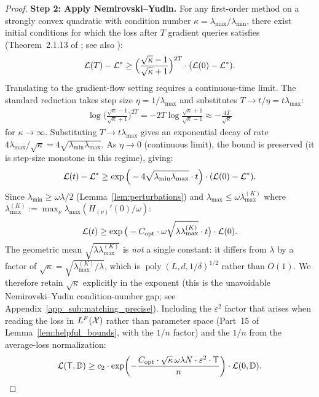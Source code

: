 \documentclass[11pt]{article}
\theoremstyle{plain}
\DeclareMathOperator{\poly}{poly}
\begin{document}
\begin{proof}
    \textbf{Step 2: Apply Nemirovski--Yudin.} For any first-order method on a strongly convex quadratic with condition number $\kappa = \lambda_{\max}/\lambda_{\min}$, there exist initial conditions for which the loss after $T$ gradient queries satisfies (Theorem~2.1.13 of \citealp{nes03}; see also \citealp{ny83}):
    \begin{align*}
        {\cal L}(T) - {\cal L}^* \ge \Big(\frac{\sqrt{\kappa}-1}{\sqrt{\kappa}+1}\Big)^{2T} \cdot ({\cal L}(0)-{\cal L}^*).
    \end{align*}
    Translating to the gradient-flow setting requires a continuous-time limit. The standard reduction takes step size $\eta = 1/\lambda_{\max}$ and substitutes $T \to t/\eta = t\lambda_{\max}$:
    \begin{align*}
        \log\Big(\frac{\sqrt\kappa - 1}{\sqrt\kappa + 1}\Big)^{2T} = -2T \log\frac{\sqrt\kappa+1}{\sqrt\kappa - 1} \approx -\frac{4T}{\sqrt\kappa}
    \end{align*}
    for $\kappa\to\infty$. Substituting $T\to t\lambda_{\max}$ gives an exponential decay of rate $4\lambda_{\max}/\sqrt\kappa = 4\sqrt{\lambda_{\min}\lambda_{\max}}$. As $\eta\to 0$ (continuous limit), the bound is preserved (it is step-size monotone in this regime), giving:
    \begin{align*}
        {\cal L}(t) - {\cal L}^* \ge \exp\Big(-4\sqrt{\lambda_{\min}\lambda_{\max}}\cdot t\Big)\cdot ({\cal L}(0)-{\cal L}^*).
    \end{align*}
    Since $\lambda_{\min}\ge \omega\lambda/2$ (Lemma~\ref{lem:perturbations}) and $\lambda_{\max}\le \omega\lambda_{\max}^{(K)}$ where $\lambda_{\max}^{(K)} := \max_\nu \lambda_{\max}(H_{(\nu)}'(0)/\omega)$:
    \begin{align*}
        {\cal L}(t) \ge \exp\big(-C_{\rm opt}\cdot \omega\sqrt{\lambda \lambda_{\max}^{(K)}}\cdot t\big)\cdot {\cal L}(0).
    \end{align*}
    The geometric mean $\sqrt{\lambda\lambda_{\max}^{(K)}}$ is {\it not} a single constant: it differs from $\lambda$ by a factor of $\sqrt{\kappa}=\sqrt{\lambda_{\max}^{(K)}/\lambda}$, which is $\poly(L,d,1/\delta)^{1/2}$ rather than $O(1)$. We therefore retain $\sqrt{\kappa}$ explicitly in the exponent (this is the unavoidable Nemirovski--Yudin condition-number gap; see Appendix~\ref{app_sub:matching_precise}). Including the $\varepsilon^2$ factor that arises when reading the loss in $L^F({\cal X})$ rather than parameter space (Part~15 of Lemma~\ref{lem:helpful_bounds}, with the $1/n$ factor) and the $1/n$ from the average-loss normalization:
    \begin{align*}
        {\cal L}({\sf T}, \mathbb{D}) \ge c_2\cdot \exp\!\left(-\frac{C_{\rm opt}\cdot \sqrt{\kappa}\,\omega\lambda N\cdot \varepsilon^2 \cdot {\sf T}}{n}\right)\cdot {\cal L}(0, \mathbb{D}).
    \end{align*}


\end{proof}
\end{document}
